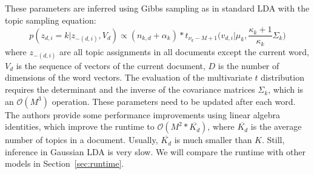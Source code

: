 \documentclass[
        a4paper,
        titlepage,
        twoside,
        parskip,
        numbers=noenddot
        ]{scrbook}
\theoremstyle{break}
\begin{document}
These parameters are inferred using Gibbs sampling as in standard LDA with the topic sampling equation: %
\begin{equation*}
  p(z_{d,i} = k | z_{-(d,i)}, V_d) \propto (n_{k,d} + \alpha_k) * t_{\nu_k - M + 1}\Big(v_{d,i} \Big| \mu_k, \frac{\kappa_k + 1}{\kappa_k} \Sigma_k\Big)
\end{equation*}
where $z_{-(d,i)}$ are all topic assignments in all documents except the current word, $V_d$ is the sequence of vectors of the current document, $D$ is the number of dimensions of the word vectors.
The evaluation of the multivariate $t$ distribution requires the determinant and the inverse of the covariance matrices $\Sigma_k$, which is an $\mathcal{O}(M^3)$ operation.
These parameters need to be updated after each word.
The authors provide some performance improvements using linear algebra identities, which improve the runtime to $\mathcal{O}(M^2 * \overline{K_d})$, where $\overline{K_d}$ is the average number of topics in a document.
Usually, $\overline{K_d}$ is much smaller than $K$.
Still, inference in Gaussian LDA is very slow.
We will compare the runtime with other models in Section~\ref{sec:runtime}.
\end{document}
